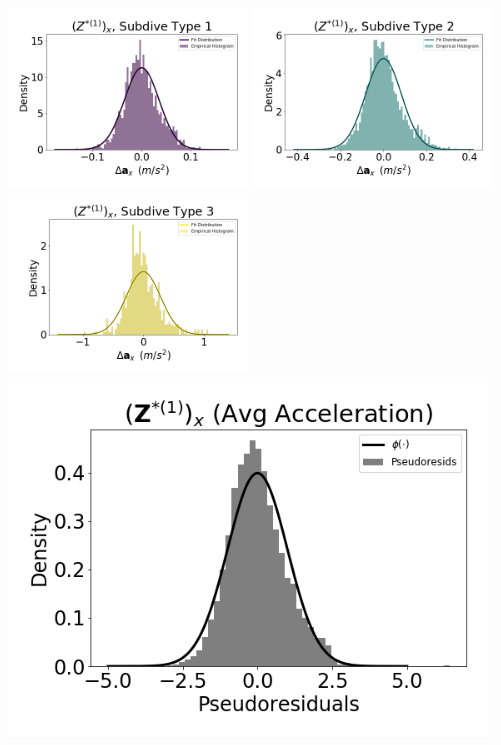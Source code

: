 \documentclass[12pt]{TD-CJS}
\begin{document}
\includegraphics[width=2.5in]{../Plots/empirical_hist_Ax_0.png}
\includegraphics[width=2.5in]{../Plots/empirical_hist_Ax_1.png}
\includegraphics[width=2.5in]{../Plots/empirical_hist_Ax_2.png}
\includegraphics[width=5in]{../Plots/psedoresids_Ax.png}
\end{document}
